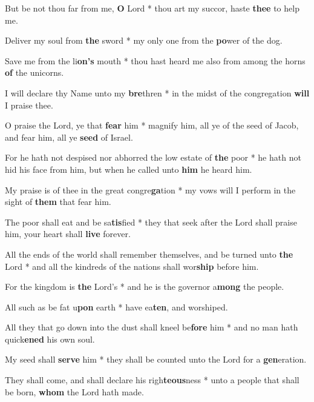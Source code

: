\begin{multicols}{2}
	But be not thou far from me, \textbf{O} Lord * thou art my succor, haste \textbf{thee} to help me.
	
	Deliver my soul from \textbf{the} sword * my only one from the \textbf{po}wer of the dog.
	
	Save me from the li\textbf{on's} mouth * thou hast heard me also from among the horns \textbf{of} the unicorns.
	
	I will declare thy Name unto my \textbf{bre}thren * in the midst of the congregation \textbf{will} I praise thee.
	
	O praise the Lord, ye that \textbf{fear} him * magnify him, all ye of the seed of Jacob, and fear him, all ye \textbf{seed} of Israel.
	
	For he hath not despised nor abhorred the low estate of \textbf{the} poor * he hath not hid his face from him, but when he called unto \textbf{him} he heard him.
	
	My praise is of thee in the great congre\textbf{ga}tion * my vows will I perform in the sight of \textbf{them} that fear him.
	
	The poor shall eat and be sa\textbf{tis}fied * they that seek after the Lord shall praise him, your heart shall \textbf{live} forever.
	
	All the ends of the world shall remember themselves, and be turned unto \textbf{the} Lord * and all the kindreds of the nations shall wor\textbf{ship} before him.
	
	For the kingdom is \textbf{the} Lord's * and he is the governor a\textbf{mong} the people.
	
	All such as be fat u\textbf{pon} earth * have ea\textbf{ten}, and worshiped.
	
	All they that go down into the dust shall kneel be\textbf{fore} him * and no man hath quick\textbf{ened} his own soul.
	
	My seed shall \textbf{serve} him * they shall be counted unto the Lord for a \textbf{gen}eration.
	
	They shall come, and shall declare his righ\textbf{teous}ness * unto a people that shall be born, \textbf{whom} the Lord hath made.
\end{multicols}